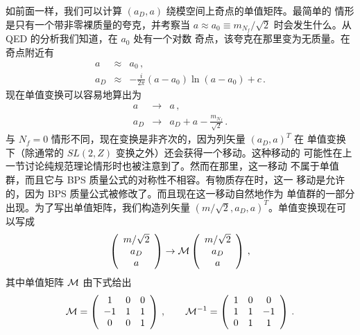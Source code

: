 如前面一样，我们可以计算 $(a_D,a)$ 绕模空间上奇点的单值矩阵。最简单的
情形是只有一个带非零裸质量的夸克，并考察当 $a \approx a_0 \equiv m_{N_f} /
\sqrt{2}$ 时会发生什么。从 QED 的分析我们知道，在 $a_0$ 处有一个对数
奇点，该夸克在那里变为无质量。在奇点附近有
$$
\begin{array}{rcl}
a& \approx & a_0\,, \\
a_D & \approx & - \frac{i}{2\pi} (a-a_0) \ln (a-a_0) +
c\,. 
\end{array}
$$
现在单值变换可以容易地算出为
$$
\begin{array}{rcl}
a &\rightarrow & a \,,\\
a_D &\rightarrow &\displaystyle{ a_D + a - \frac{m_{N_f}}{\sqrt{2}}}\,.
\end{array}
$$
与 $N_f = 0$ 情形不同，现在变换是非齐次的，因为列矢量 $(a_D, a)^T$ 在
单值变换下（除通常的 $SL(2,Z)$ 变换之外）还会获得一个移动。这种移动的
可能性在上一节讨论纯规范理论情形时也被注意到了。然而在那里，这一移动
不属于单值群，而且它与 BPS 质量公式的对称性不相容。有物质存在时，这一
移动是允许的，因为 BPS 质量公式被修改了。而且现在这一移动自然地作为
单值群的一部分出现。为了写出单值矩阵，我们构造列矢量 $(m/ \sqrt{2} , a_D ,
a )^T$。单值变换现在可以写成
$$
\left ( \begin{array}{c} m/ \sqrt{2} \\ a_D \\ a \end{array} \right)
\rightarrow {\cal M} 
\left ( \begin{array}{c} m/ \sqrt{2} \\ a_D \\ a \end{array}\right)\,, 
$$
其中单值矩阵 ${\cal M}$ 由下式给出
$$
{\cal M } = \left ( \begin{array}{ccc}
1 & 0 & 0 \\ -1 & 1 & 1 \\ 0 & 0 & 1
\end{array} \right )\,,\qquad
{\cal M}^{-1} = \left(\begin{array}{ccc}
1 & 0 & 0 \\ 1 & 1 & -1 \\ 0 & 1 & 1
\end{array}\right) \,.
$$


